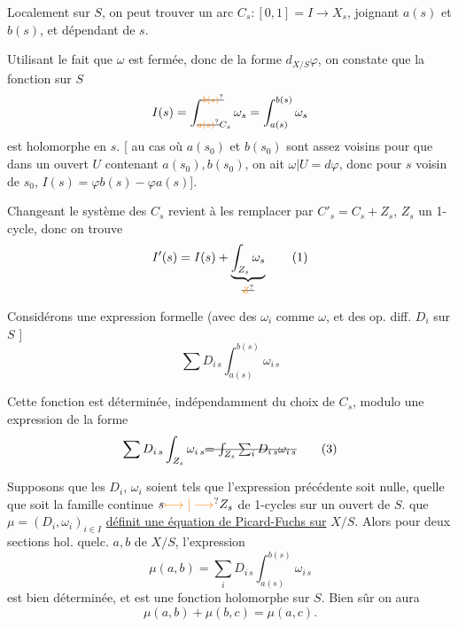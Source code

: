 Localement sur $S$, on peut trouver un arc   $C_s:[0,1]=I\longrightarrow X_s$, joignant $a(s)$ et $b(s)$, et dépendant  de $s$.

Utilisant le fait que $\omega$ est fermée, donc  de la forme $d_{X/S}\varphi$, on constate que la fonction sur $S$
\[
 I(s)=\int_{\deleted{\unsure{a(s)}}C_s}^{\deleted{\unsure{b(s)}}}\omega_s
       =\int_{a(s)}^{b(s)}\omega_s
\]
est holomorphe en $s$. [   au cas où  $a(s_0)$ et $b(s_0)$ sont assez voisins pour que dans un ouvert $U$ contenant $a(s_0),b(s_0)$, on ait $\omega|U=d\varphi$, donc pour $s$ voisin de $s_0$, $I(s)=\varphi b(s)-\varphi a(s)$].

Changeant le système des $C_s$ revient à les remplacer par $C'_s=C_s+Z_s$, $Z_s$ un 1-cycle, donc on trouve
\[
 I'(s)=I(s)+\underbrace{\int_{Z_s}\omega_s}_{\deleted{\unsure{Z}}}
 \tag*{(1)}
\]

Considérons une expression formelle (avec des $\omega_i$ comme $\omega$, et des op. diff.  $D_i$ sur $S$ ]
\[
 \sum D_{i\,s}\int_{a(s)}^{b(s)}\omega_{i\,s}
 \tag*{(2)}
\]

Cette fonction est déterminée, indépendamment du choix de $C_s$, modulo une expression de la forme
\[
 \sum D_{i\,s}\int_{Z_s}\omega_{i\,s}
 \deleted{=\int_{Z_s}\sum_i D_{i\,s}\omega_{i\,s}}
 \tag*{(3)}
\]


Supposons que les $D_i$, $\omega_i$ soient tels que l'expression précédente soit nulle, quelle que soit  la famille continue $s\unsure{\longmapsto|\longrightarrow}Z_s$ de 1-cycles sur un ouvert de $S$.    que  $\mu=(D_i,\omega_i)_{i\in I}$ \uline{définit une équation de Picard-Fuchs sur} $X/S$. Alors pour deux sections hol. quelc. $a,b$ de $X/S$, l'expression
\[
 \mu(a,b)=\sum_i D_{i\,s}\int_{a(s)}^{b(s)}\omega_{i\,s}
 \tag*{(4}
\]
est bien déterminée, et est une fonction holomorphe sur $S$. Bien sûr on aura
\[
 \mu(a,b)+\mu(b,c)=\mu(a,c).\tag*{(5)}
\]

